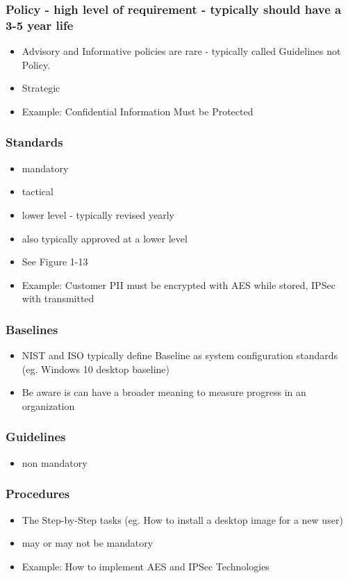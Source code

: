\documentclass[11pt]{article}
\begin{document}
\subsubsection{Policy - high level of requirement - typically should have a 3-5 year life}
\label{sec:orgf87eff0}
\begin{itemize}
\item Advisory and Informative policies are rare - typically called Guidelines not Policy.
\item Strategic
\item Example: Confidential Information Must be Protected
\end{itemize}
\subsubsection{Standards}
\label{sec:org20877f9}
\begin{itemize}
\item mandatory
\item tactical
\item lower level - typically revised yearly
\item also typically approved at a lower level
\item See Figure 1-13
\item Example: Customer PII must be encrypted with AES while stored, IPSec with transmitted
\end{itemize}
\subsubsection{Baselines}
\label{sec:org14ae196}
\begin{itemize}
\item NIST and ISO typically define Baseline as system configuration standards (eg. Windows 10 desktop baseline)
\item Be aware is can have a broader meaning to measure progress in an organization
\end{itemize}
\subsubsection{Guidelines}
\label{sec:orgded50dd}
\begin{itemize}
\item non mandatory
\end{itemize}
\subsubsection{Procedures}
\label{sec:org4f59726}
\begin{itemize}
\item The Step-by-Step tasks (eg. How to install a desktop image for a new user)
\item may or may not be mandatory
\item Example: How to implement AES and IPSec Technologies
\end{itemize}
\end{document}
